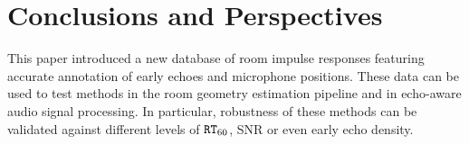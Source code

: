 \section{Conclusions and Perspectives}\label{sec:dechorateapp:conclusion}

This paper introduced a new database of room impulse responses featuring accurate annotation of early echoes and microphone positions. These data can be used to test methods in the room geometry estimation pipeline and in echo-aware audio signal processing. In particular, robustness of these methods can be validated against different levels of $\mathtt{RT}_{60}$, SNR or even early echo density.